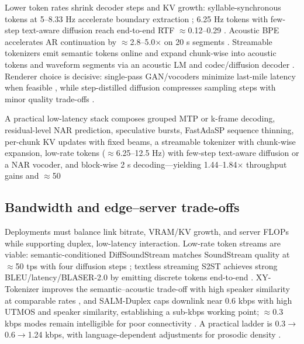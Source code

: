 \documentclass{article}
\begin{document}
Lower token rates shrink decoder steps and KV growth: syllable-synchronous tokens at 5--8.33 Hz accelerate boundary extraction \cite{baade2024syllablelmlearningcoarsesemanticunitsspe}; 6.25 Hz tokens with few-step text-aware diffusion reach end-to-end RTF $\approx$0.12--0.29 \cite{wang2025tadicodectextawarediffusionspeechtokeniz}. Acoustic BPE accelerates AR continuation by $\approx$2.8--5.0$\times$ on 20 s segments \cite{shen2024acousticbpespeechgenerationdiscretetoken}. Streamable tokenizers emit semantic tokens online and expand chunk-wise into acoustic tokens and waveform segments via an acoustic LM and codec/diffusion decoder \cite{turetzky2024lastlanguagemodelawarespeechtokenization,bai2025dmelspeechtokenizationmadesimple,yang2025diffsoundstreamefficientspeechtokenizati,vashishth2024stabspeechtokenizerassessmentbenchmark,zhao2024textlessstreamingspeechtranslationsemant}. Renderer choice is decisive: single-pass GAN/vocoders minimize last-mile latency when feasible \cite{wang2024evaluatingtextspeechsynthesislargediscre}, while step-distilled diffusion compresses sampling steps with minor quality trade-offs \cite{yang2025diffsoundstreamefficientspeechtokenizati}.

A practical low-latency stack composes grouped MTP or k-frame decoding, residual-level NAR prediction, speculative bursts, FastAdaSP sequence thinning, per-chunk KV updates with fixed beams, a streamable tokenizer with chunk-wise expansion, low-rate tokens ($\approx$6.25--12.5 Hz) with few-step text-aware diffusion or a NAR vocoder, and block-wise 2 s decoding---yielding 1.44--1.84$\times$ throughput gains and $\approx$50%

\subsection{Bandwidth and edge--server trade-offs} \label{subsec:Bandwidth and edge--server trade-offs}
Deployments must balance link bitrate, VRAM/KV growth, and server FLOPs while supporting duplex, low-latency interaction. Low-rate token streams are viable: semantic-conditioned DiffSoundStream matches SoundStream quality at $\approx$50 tps with four diffusion steps \cite{yang2025diffsoundstreamefficientspeechtokenizati}; textless streaming S2ST achieves strong BLEU/latency/BLASER-2.0 by emitting discrete tokens end-to-end \cite{zhao2024textlessstreamingspeechtranslationsemant}. XY-Tokenizer improves the semantic--acoustic trade-off with high speaker similarity at comparable rates \cite{gong2025xytokenizermitigatingsemanticacousticcon}, and SALM-Duplex caps downlink near 0.6 kbps with high UTMOS and speaker similarity, establishing a sub-kbps working point; $\approx$0.3 kbps modes remain intelligible for poor connectivity \cite{hu2025salmduplexefficientdirectmodelingspeechl,xue2025hhcodechighcompressionfidelitydiscretene}. A practical ladder is 0.3$\rightarrow$0.6$\rightarrow$1.24 kbps, with language-dependent adjustments for prosodic density \cite{onda2025benchmarkingprosodyencodingdiscretespeec,zhang2025impactframeratesspeechtokenizercasestudy}.
\end{document}
